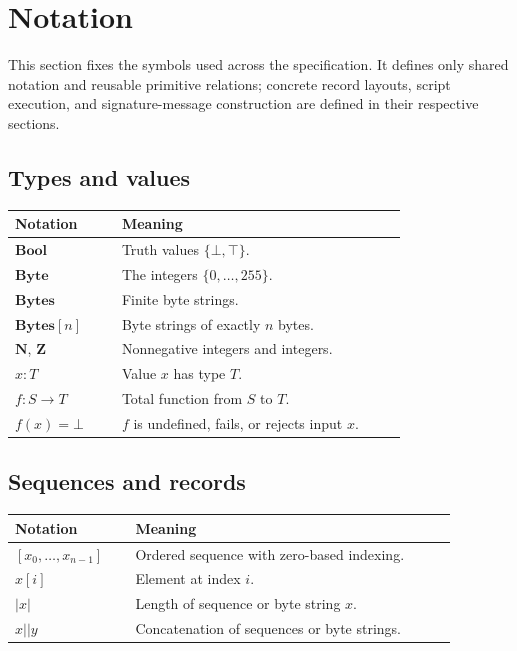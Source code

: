 \section{Notation}
\label{sec:notation}

This section fixes the symbols used across the specification. It defines only
shared notation and reusable primitive relations; concrete record layouts,
script execution, and signature-message construction are defined in their
respective sections.

\subsection{Types and values}

\begin{longtable}{@{}L{0.24\linewidth}L{0.64\linewidth}@{}}
\toprule
Notation & Meaning \\
\midrule
\(\mathbf{Bool}\) & Truth values \(\{\bot,\top\}\). \\
\(\mathbf{Byte}\) & The integers \(\{0,\ldots,255\}\). \\
\(\mathbf{Bytes}\) & Finite byte strings. \\
\(\mathbf{Bytes}[n]\) & Byte strings of exactly \(n\) bytes. \\
\(\mathbf{N}\), \(\mathbf{Z}\) & Nonnegative integers and integers. \\
\(x:T\) & Value \(x\) has type \(T\). \\
\(f:S \to T\) & Total function from \(S\) to \(T\). \\
\(f(x)=\bot\) & \(f\) is undefined, fails, or rejects input \(x\). \\
\bottomrule
\end{longtable}

\subsection{Sequences and records}

\begin{longtable}{@{}L{0.24\linewidth}L{0.64\linewidth}@{}}
\toprule
Notation & Meaning \\
\midrule
\([x_0,\ldots,x_{n-1}]\) & Ordered sequence with zero-based indexing. \\
\(x[i]\) & Element at index \(i\). \\
\(|x|\) & Length of sequence or byte string \(x\). \\
\(x || y\) & Concatenation of sequences or byte strings. \\
\bottomrule
\end{longtable}

